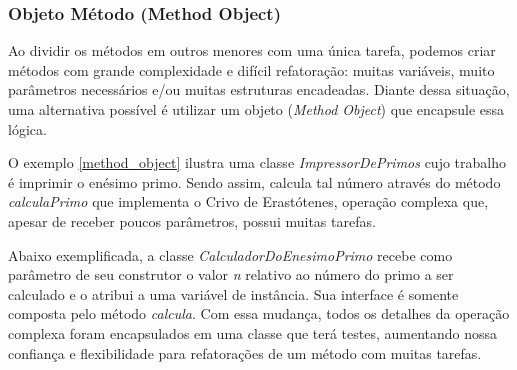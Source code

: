 


\subsubsection{Objeto Método (Method Object)}
\label{objeto_metodo}
Ao dividir os métodos em outros menores com uma única tarefa, podemos criar métodos com grande complexidade e difícil refatoração: muitas variáveis, muito parâmetros 
necessários e/ou muitas estruturas encadeadas. Diante dessa situação, uma alternativa possível é utilizar um objeto (\textit{Method Object}) que encapsule essa 
lógica.
	

O exemplo \ref{method_object} ilustra uma classe \textit{ImpressorDePrimos} cujo trabalho é imprimir o enésimo primo. Sendo assim, calcula tal número através
do método \textit{calculaPrimo} que implementa o Crivo de Erastótenes, operação complexa que, apesar de receber poucos parâmetros, possui muitas tarefas.



Abaixo exemplificada, a classe \textit{CalculadorDoEnesimoPrimo} recebe como parâmetro de seu construtor o valor \textit{n} relativo ao número do primo a ser 
calculado e o atribui a uma variável de instância. Sua interface é somente composta pelo método \textit{calcula}. Com essa mudança, todos os detalhes da operação 
complexa foram encapsulados em uma classe que terá testes, aumentando nossa confiança e flexibilidade para refatorações de um método com muitas tarefas.


	
